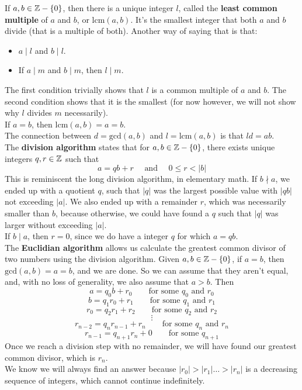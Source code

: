 \documentclass[12pt]{article}
\begin{document}
    If $a, b \in \mathbb{Z} - \{0\}$,
    then there is a unique integer $l$,
    called the \textbf{least common multiple} of $a$ and $b$,
    or $\text{lcm}(a, b)$.
    It's the smallest integer that both $a$ and $b$ divide
    (that is a multiple of both).
    Another way of saying that is that:
    \begin{itemize}[label=$\diamond$]
        \item 
            $a \mid l$ and $b \mid l$.
        \item
            If $a \mid m$ and $b \mid m$, then $l \mid m$.
    \end{itemize}
    The first condition trivially shows that $l$ is a common multiple
    of $a$ and $b$.
    The second condition shows that it is the smallest
    (for now however, we will not show why $l$ divides $m$
    necessarily). \\ 
    If $a = b$, then $\text{lcm}(a, b) = a = b$. \\
 
    The connection between $d = \text{gcd}(a, b)$
    and $l = \text{lcm}(a, b)$
    is that $ld = ab$. \\

    The \textbf{division algorithm} states that
    for $a, b \in \mathbb{Z} - \{0\}$,
    there exists unique integers $q, r \in \mathbb{Z}$ such that
    \[ a = qb + r \quad \text{ and } \quad 0 \leqslant r < |b| \]
    This is reminiscent the long division algorithm,
    in elementary math. 
    If $b \nmid a$,
    we ended up with a quotient $q$,
    such that $|q|$ was the largest possible value
    with $|qb|$ not exceeding $|a|$.
    We also ended up with a remainder $r$,
    which was necessarily smaller than $b$,
    because otherwise,
    we could have found a $q$ such that $|q|$ was larger
    without exceeding $|a|$. \\
    If $b \mid a$, then $r = 0$,
    since we do have a integer $q$ for which $a = qb$. \\

    The \textbf{Euclidian algorithm} allows us
    calculate the greatest common divisor of two numbers
    using the division algorithm.
    Given $a, b \in \mathbb{Z} - \{0\}$,
    if $a = b$, then $\text{gcd}(a, b) = a = b$,
    and we are done. 
    So we can assume that they aren't equal,
    and, with no loss of generality,
    we also assume that $a > b$.
    Then
    \[ a = q_0b + r_0 \qquad \text{for some $q_0$ and $r_0$} \]
    \[ b = q_1r_0 + r_1 \qquad \text{for some $q_1$ and $r_1$} \]
    \[ r_0 = q_2r_1 + r_2 \qquad \text{for some $q_2$ and $r_2$} \]
    \[ \vdots \]
    \[ r_{n-2} = q_{n}r_{n-1} + r_{n}
    \qquad \text{for some $q_n$ and $r_n$} \]
    \[ r_{n-1} = q_{n+1}r_n + 0
    \qquad \text{for some $q_{n+1}$} \]
    Once we reach a division step with no remainder,
    we will have found our greatest common divisor,
    which is $r_n$. \\
    We know we will always find an answer
    because $|r_0| > |r_1| \dots > |r_n|$
    is a decreasing sequence of integers,
    which cannot continue indefinitely. \\
\end{document}
